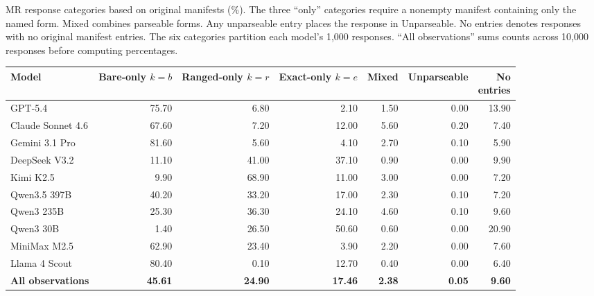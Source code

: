 \begin{tableorg}[!htbp]
\small
\centering
\setlength{\tabcolsep}{4pt}
\caption{MR response categories based on original \myso manifests (\%).
The three ``only'' categories require a nonempty manifest containing only the named form.
Mixed combines parseable forms.
Any unparseable entry places the response in Unparseable.
No entries denotes responses with no original manifest entries.
The six categories partition each model's 1,000 responses.
``All observations'' sums counts across 10,000 responses before computing percentages.}
\label{tab:rq1_model_variation}
\begin{adjustbox}{max width=\textwidth}
\begin{tabular}{lrrrrrr}
\toprule
\textbf{Model} & \makecell{\textbf{Bare-only}\\$k=b$} & \makecell{\textbf{Ranged-only}\\$k=r$} & \makecell{\textbf{Exact-only}\\$k=e$} & \textbf{Mixed} & \textbf{Unparseable} & \makecell{\textbf{No}\\\textbf{entries}} \\
\midrule
GPT-5.4 & 75.70 & 6.80 & 2.10 & 1.50 & 0.00 & 13.90 \\
Claude Sonnet 4.6 & 67.60 & 7.20 & 12.00 & 5.60 & 0.20 & 7.40 \\
Gemini 3.1 Pro & 81.60 & 5.60 & 4.10 & 2.70 & 0.10 & 5.90 \\
DeepSeek V3.2 & 11.10 & 41.00 & 37.10 & 0.90 & 0.00 & 9.90 \\
Kimi K2.5 & 9.90 & 68.90 & 11.00 & 3.00 & 0.00 & 7.20 \\
Qwen3.5 397B & 40.20 & 33.20 & 17.00 & 2.30 & 0.10 & 7.20 \\
Qwen3 235B & 25.30 & 36.30 & 24.10 & 4.60 & 0.10 & 9.60 \\
Qwen3 30B & 1.40 & 26.50 & 50.60 & 0.60 & 0.00 & 20.90 \\
MiniMax M2.5 & 62.90 & 23.40 & 3.90 & 2.20 & 0.00 & 7.60 \\
Llama 4 Scout & 80.40 & 0.10 & 12.70 & 0.40 & 0.00 & 6.40 \\
\midrule
\textbf{All observations} & \textbf{45.61} & \textbf{24.90} & \textbf{17.46} & \textbf{2.38} & \textbf{0.05} & \textbf{9.60} \\

\bottomrule
\end{tabular}
\end{adjustbox}
\end{tableorg}
